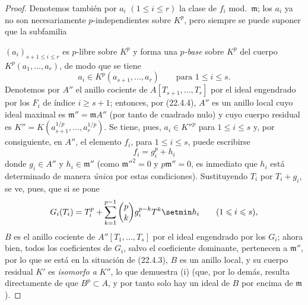 \begin{proof}
Denotemos también por $a_i$ $(1\leqslant i\leqslant r)$ la clase de $f_i$
mod.~$\mathfrak m$; los $a_i$ ya no son necesariamente $p$-independientes
sobre $K^p$, pero siempre se puede suponer que la subfamilia


$(a_i)_{s+1\leqslant i\leqslant r}$ es $p$-libre sobre $K^p$ y forma una
\emph{$p$-base} sobre $K^p$ del cuerpo $K^p(a_1,\ldots,a_r)$, de modo que se tiene
\[
  a_i\in K^p(a_{s+1},\ldots,a_r)\qquad\text{para }1\leqslant i\leqslant s.
\]
Denotemos por $A''$ el anillo cociente de $A[T_{s+1},\ldots,T_r]$ por el ideal
engendrado por los $F_i$ de índice $i\geqslant s+1$; entonces, por (22.4.4), $A''$
es un anillo local cuyo ideal maximal es $\mathfrak m''=\mathfrak mA''$
(por tanto de cuadrado nulo) y cuyo cuerpo residual es
$K''=K(a_{s+1}^{1/p},\ldots,a_r^{1/p})$. Se tiene, pues,
$a_i\in K''^p$ para $1\leqslant i\leqslant s$ y, por consiguiente, en $A''$,
el elemento $f_i$, para $1\leqslant i\leqslant s$, puede escribirse
\begin{equation}
\label{0.22.4.7.3-fr}
  f_i=g_i^p+h_i
  \tag{22.4.7.3}
\end{equation}
donde $g_i\in A''$ y $h_i\in\mathfrak m''$ (como $\mathfrak m''^2=0$ y
$p\mathfrak m''=0$, es inmediato que $h_i$ está determinado de manera
\emph{única} por estas condiciones). Sustituyendo $T_i$ por $T_i+g_i$, se ve, pues,
que si se pone
\[
  G_i(T_i)=T_i^p+\sum_{k=1}^{p-1}\binom pk g_i^{p-k}T^k\setmin h_i
  \qquad(1\leqslant i\leqslant s),
\]
$B$ es el anillo cociente de $A''[T_1,\ldots,T_s]$ por el ideal engendrado por los
$G_i$; ahora bien, todos los coeficientes de $G_i$, salvo el coeficiente dominante,
pertenecen a $\mathfrak m''$, por lo que se está en la situación de (22.4.3),
$B$ es un anillo local, y su cuerpo residual $K'$ es \emph{isomorfo a}
$K''$, lo que demuestra (i) (que, por lo demás, resulta directamente de que
$B^p\subset A$, y por tanto solo hay un ideal de $B$ por encima de
$\mathfrak m$).


\end{proof}
